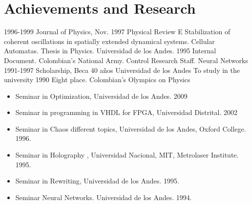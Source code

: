 \section{Achievements and Research}

\begin{entrylist}
  \entry
	{1996-1999}
	{Journal of Physics, Nov. 1997}
	{Physical Review E}
	{Stabilization of coherent oscillations in spatially extended dynamical systems.
	Cellular Automatas. Thesis in Physics. Universidad de los Andes.}
  \entry
	{1995}
	{Internal Document.}
	{Colombian’s National Army.}
	{Control Research Staff. Neural Networks}
  \entry
	{1991-1997}
	{Scholarship, Beca 40 años}
	{Universidad de los Andes}
	{To study in the university}
  \entry
	{1990}
	{Eight place.}
	{Colombian’s Olympics on Physics}
	{}
\end{entrylist}

\begin{itemize}
	\item Seminar in Optimization, Universidad de los Andes. 2009
	\item Seminar in programming in VHDL for FPGA, Universidad Distrital. 2002
	\item Seminar in Chaos different topics, Universidad de los Andes, Oxford College. 1996.
	\item Seminar in Holography , Universidad Nacional, MIT, Metrolaser Institute. 1995.
	\item Seminar in Rewriting, Universidad de los Andes. 1995.
	\item Seminar Neural Networks. Universidad de los Andes. 1994.
\end{itemize}
